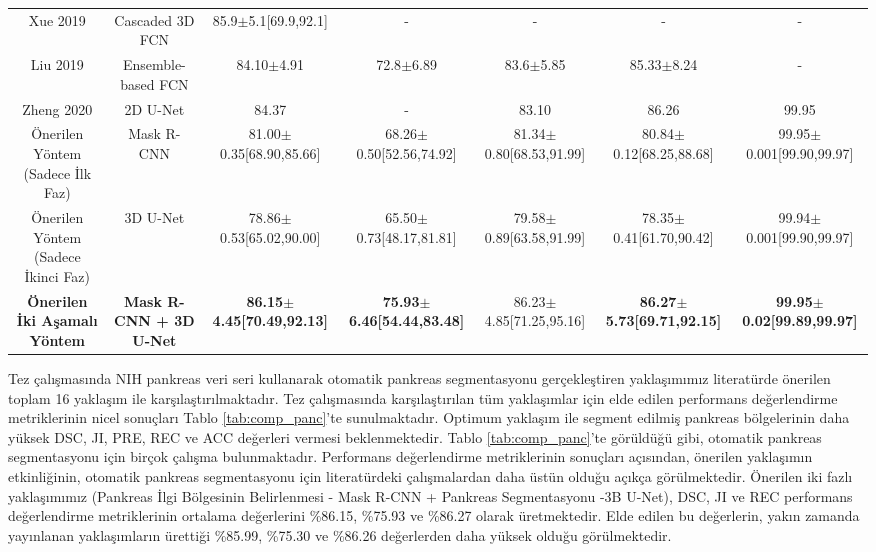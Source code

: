 \begin{table}
\begin{adjustbox}{width=\textwidth}
\begin{tabular}{ccccccc}
			Xue 2019   \cite{xue2019cascaded} &  Cascaded 3D FCN & 85.9$\pm$5.1[69.9,92.1]  &  - &  - &  - & - \\	
			Liu 2019  \cite{liu2019automatic}  &  Ensemble-based FCN  & 84.10$\pm$4.91  &  72.8$\pm$6.89  &  83.6$\pm$5.85 &  85.33$\pm$8.24 & -  \\		 
			Zheng 2020  \cite{zheng2020deep}  &  2D U-Net & 84.37 & -  &  83.10 & 86.26 & 99.95\\
			Önerilen Yöntem (Sadece İlk Faz)  &  Mask R-CNN  & 81.00$\pm$0.35[68.90,85.66] & 68.26$\pm$0.50[52.56,74.92] & 81.34$\pm$0.80[68.53,91.99] & 80.84$\pm$0.12[68.25,88.68] & 99.95$\pm$0.001[99.90,99.97] \\	
			Önerilen Yöntem (Sadece İkinci Faz)  &  3D U-Net  & 78.86$\pm$0.53[65.02,90.00] & 65.50$\pm$0.73[48.17,81.81] & 79.58$\pm$0.89[63.58,91.99] & 78.35$\pm$0.41[61.70,90.42] & 99.94$\pm$0.001[99.90,99.97] \\	
			\textbf{Önerilen İki Aşamalı Yöntem} &  \textbf{Mask R-CNN + 3D U-Net}  & \textbf{86.15$\pm$4.45[70.49,92.13]} &  \textbf{75.93$\pm$6.46[54.44,83.48]} &  86.23$\pm$4.85[71.25,95.16]  & \textbf{86.27$\pm$5.73[69.71,92.15]} & \textbf{99.95$\pm$0.02[99.89,99.97]} \\ 
			\bottomrule
		\end{tabular}
	\end{adjustbox}
\end{table}

Tez çalışmasında NIH pankreas veri seri kullanarak otomatik pankreas segmentasyonu gerçekleştiren yaklaşımımız literatürde önerilen toplam 16 yaklaşım ile karşılaştırılmaktadır. Tez çalışmasında karşılaştırılan tüm yaklaşımlar için elde edilen performans değerlendirme metriklerinin nicel sonuçları Tablo \ref{tab:comp_panc}'te sunulmaktadır. Optimum yaklaşım ile segment edilmiş pankreas bölgelerinin daha yüksek DSC, JI, PRE, REC ve ACC değerleri vermesi beklenmektedir. Tablo \ref{tab:comp_panc}'te görüldüğü gibi, otomatik pankreas segmentasyonu için birçok çalışma bulunmaktadır. Performans değerlendirme metriklerinin sonuçları açısından, önerilen yaklaşımın etkinliğinin, otomatik pankreas segmentasyonu için literatürdeki çalışmalardan daha üstün olduğu açıkça görülmektedir. Önerilen iki fazlı yaklaşımımız (Pankreas İlgi Bölgesinin Belirlenmesi - Mask R-CNN + Pankreas Segmentasyonu -3B U-Net), DSC, JI ve REC performans değerlendirme metriklerinin ortalama değerlerini \%86.15, \%75.93 ve \%86.27 olarak üretmektedir. Elde edilen bu değerlerin, yakın zamanda yayınlanan yaklaşımların ürettiği \%85.99, \%75.30 ve \%86.26 değerlerden daha yüksek olduğu görülmektedir.

